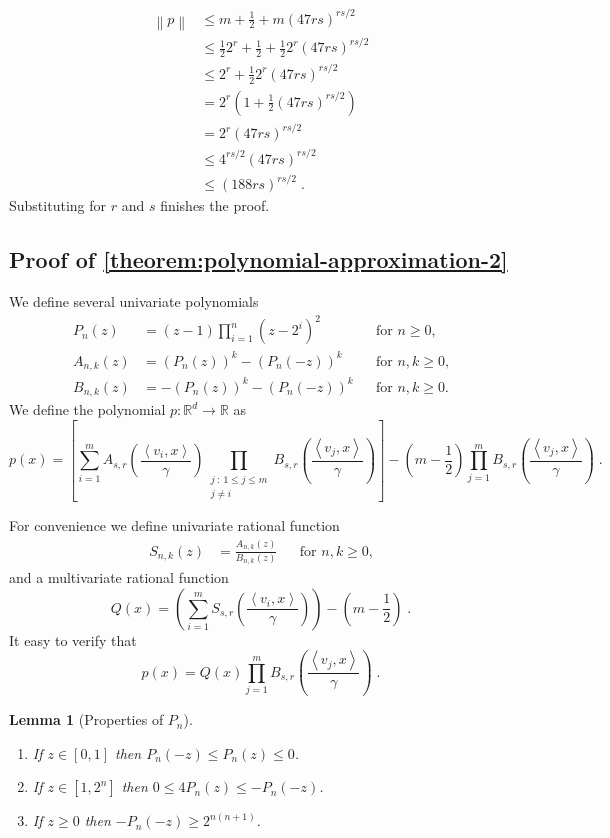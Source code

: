 \documentclass[12pt]{article}
\newtheorem{lemma}[definition]{Lemma}
\newcommand{\R}{\mathbb{R}}  %
\newcommand{\ip}[2]{\left\langle #1, #2 \right\rangle} %
\newcommand{\norm}[1]{\left\| #1 \right\|}  %
\begin{document}
\begin{align*}
\norm{p}
& \le m + \frac{1}{2} + m \left(47 rs \right)^{rs/2} \\
& \le \frac{1}{2} 2^r + \frac{1}{2} + \frac{1}{2} 2^r \left(47 rs \right)^{rs/2} \\
& \le 2^r + \frac{1}{2} 2^r \left(47 rs \right)^{rs/2} \\
& = 2^r \left(1 + \frac{1}{2} \left(47 rs \right)^{rs/2} \right) \\
& = 2^r \left(47 rs \right)^{rs/2} \\
& \le 4^{rs/2} \left(47 rs \right)^{rs/2} \\
& \le \left(188 rs \right)^{rs/2} \; .
\end{align*}
Substituting for $r$ and $s$ finishes the proof.


\subsection{Proof of \autoref{theorem:polynomial-approximation-2}}
\label{section:proof-of-polynomial-approximation-2}

We define several univariate polynomials
\begin{align*}
P_n(z) & = (z - 1) \prod_{i=1}^n (z - 2^i)^2 && \text{for $n \ge 0$,} \\
A_{n,k}(z) & = (P_n(z))^k - (P_n(-z))^k && \text{for $n,k \ge 0$,} \\
B_{n,k}(z) & = - (P_n(z))^k - (P_n(-z))^k && \text{for $n,k \ge 0$.}
\end{align*}
We define the polynomial $p:\R^d \to \R$ as
$$
p(x) = \left[ \sum_{i=1}^m A_{s,r}\left( \frac{\ip{v_i}{x}}{\gamma} \right) \prod_{\substack{j ~:~ 1 \le j \le m \\ j \neq i}} B_{s,r} \left( \frac{\ip{v_j}{x}}{\gamma} \right) \right]
- \left(m - \frac{1}{2} \right) \prod_{j=1}^m B_{s,r} \left( \frac{\ip{v_j}{x}}{\gamma} \right) \; .
$$

For convenience we define univariate rational function
\begin{align*}
S_{n,k}(z) & = \frac{A_{n,k}(z)}{B_{n,k}(z)} && \text{for $n,k \ge 0$,}
\end{align*}
and a multivariate rational function
$$
Q(x) = \left( \sum_{i=1}^m S_{s,r}\left( \frac{\ip{v_i}{x}}{\gamma} \right) \right) - \left(m - \frac{1}{2} \right) \; .
$$
It easy to verify that
$$
p(x) = Q(x) \prod_{j=1}^m B_{s,r} \left( \frac{\ip{v_j}{x}}{\gamma} \right) \; .
$$

\begin{lemma}[Properties of $P_n$]
\label{lemma:properties-of-p-n}
\hspace{1cm} %
\begin{enumerate}
\item If $z \in [0,1]$ then $P_n(-z) \le P_n(z) \le 0$.
\item If $z \in [1,2^n]$ then $0 \le 4P_n(z) \le -P_n(-z)$.
\item If $z \ge 0$ then $-P_n(-z) \ge 2^{n(n+1)}$.
\end{enumerate}
\end{lemma}
\end{document}
